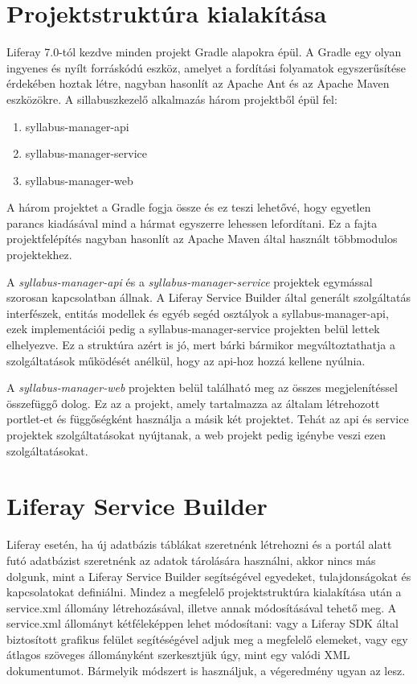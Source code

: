 \documentclass[hidelinks, 12pt, a4paper]{report}
\begin{document}
\section{Projektstruktúra kialakítása}

Liferay 7.0-tól kezdve minden projekt Gradle \cite{gradle} alapokra épül. A Gradle egy olyan ingyenes és nyílt forráskódú eszköz, amelyet a fordítási folyamatok egyszerűsítése érdekében hoztak létre, nagyban hasonlít az Apache Ant \cite{apache-ant} és az Apache Maven \cite{apache-maven} eszközökre. A sillabuszkezelő alkalmazás három projektből épül fel:
\begin{enumerate}
\item syllabus-manager-api
\item syllabus-manager-service
\item syllabus-manager-web
\end{enumerate}
A három projektet a Gradle fogja össze és ez teszi lehetővé, hogy egyetlen parancs kiadásával mind a hármat egyszerre lehessen lefordítani. Ez a fajta projektfelépítés nagyban hasonlít az Apache Maven által használt többmodulos projektekhez.

A \emph{syllabus-manager-api} és a \emph{syllabus-manager-service} projektek egymással szorosan kapcsolatban állnak. A Liferay Service Builder által generált szolgáltatás interfészek, entitás modellek és egyéb segéd osztályok a syllabus-manager-api, ezek implementációi pedig a syllabus-manager-service projekten belül lettek elhelyezve. Ez a struktúra azért is jó, mert bárki bármikor megváltoztathatja a szolgáltatások működését anélkül, hogy az api-hoz hozzá kellene nyúlnia.

A \emph{syllabus-manager-web} projekten belül található meg az összes megjelenítéssel összefüggő dolog. Ez az a projekt, amely tartalmazza az általam létrehozott portlet-et és függőségként használja a másik két projektet. Tehát az api és service projektek szolgáltatásokat nyújtanak, a web projekt pedig igénybe veszi ezen szolgáltatásokat.

\section{Liferay Service Builder}

Liferay esetén, ha új adatbázis táblákat szeretnénk létrehozni és a portál alatt futó adatbázist szeretnénk az adatok tárolására használni, akkor nincs más dolgunk, mint a Liferay Service Builder segítségével egyedeket, tulajdonságokat és kapcsolatokat definiálni. Mindez a megfelelő projektstruktúra kialakítása után a service.xml állomány létrehozásával, illetve annak módosításával tehető meg. A service.xml állományt kétféleképpen lehet módosítani: vagy a Liferay SDK által biztosított grafikus felület segítéségével adjuk meg a megfelelő elemeket, vagy egy átlagos szöveges állományként szerkesztjük úgy, mint egy valódi XML dokumentumot. Bármelyik módszert is használjuk, a végeredmény ugyan az lesz.
\end{document}
